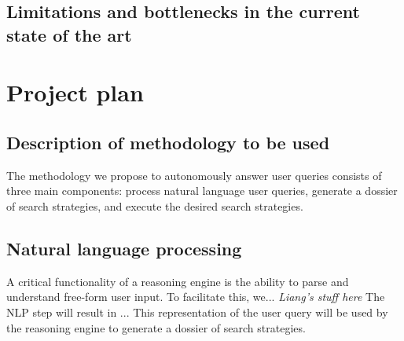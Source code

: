 \documentclass[11pt,notitlepage]{article}
\begin{document}
\subsection{Limitations and bottlenecks in the current state of the art}

\section{Project plan}
\subsection{Description of methodology to be used}
The methodology we propose to autonomously answer user queries consists of three main components: process natural language user queries, generate a dossier of search strategies, and execute the desired search strategies.
\subsection{Natural language processing}
A critical functionality of a reasoning engine is the ability to parse and understand free-form user input. To facilitate this, we...
\textit{Liang's stuff here}
The NLP step will result in ... This representation of the user query will be used by the reasoning engine to generate a dossier of search strategies. 
\end{document}
